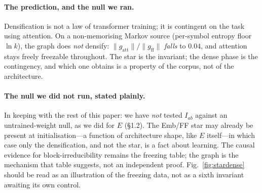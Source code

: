 \paragraph{The prediction, and the null we ran.} Densification is not a law of
transformer training; it is contingent on the task using attention. On a
non-memorising Markov source (per-symbol entropy floor $\ln k$), the graph does
\emph{not} densify: $\lVert g_{\mathrm{att}}\rVert/\lVert g_{\mathrm{ff}}\rVert$
\emph{falls} to $0.04$, and attention stays freely freezable throughout. The
star is the invariant; the dense phase is the contingency, and which one obtains
is a property of the corpus, not of the architecture.

\paragraph{The null we did not run, stated plainly.} In keeping with the rest of
this paper: we have \emph{not} tested $I_{ab}$ against an untrained-weight null,
as we did for $E$ (\S1.2). The Emb/FF star may already be present at
initialisation---a function of architecture shape, like $E$ itself---in which
case only the densification, and not the star, is a fact about learning. The
causal evidence for block-irreducibility remains the freezing table; the graph
is the mechanism that table suggests, not an independent proof. Fig.~\ref{fig:stardense}
should be read as an illustration of the freezing data, not as a sixth invariant
awaiting its own control.
